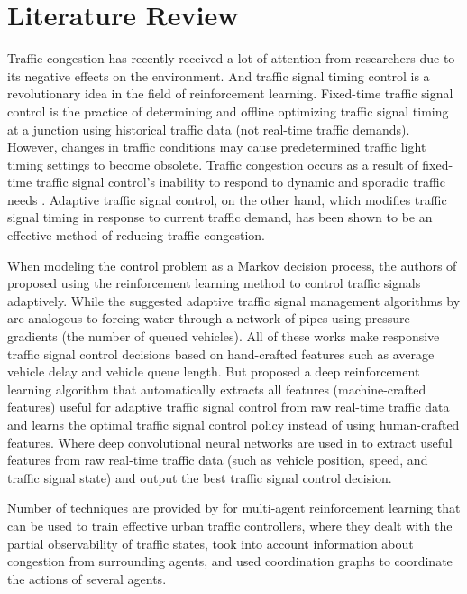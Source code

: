 \documentclass[conference]{IEEEtran}
\begin{document}
\section{Literature Review}
Traffic congestion has recently received a lot of attention from researchers due to its negative effects on the environment. And traffic signal timing control is a revolutionary idea in the field of reinforcement learning. Fixed-time traffic signal control is the practice of determining and offline optimizing traffic signal timing at a junction using historical traffic data (not real-time traffic demands). However, changes in traffic conditions may cause predetermined traffic light timing settings to become obsolete. Traffic congestion occurs as a result of fixed-time traffic signal control's inability to respond to dynamic and sporadic traffic needs \cite{gao2017adaptive}. Adaptive traffic signal control, on the other hand, which modifies traffic signal timing in response to current traffic demand, has been shown to be an effective method of reducing traffic congestion.

When modeling the control problem as a Markov decision process, the authors of \cite{mannion2016experimental} proposed using the reinforcement learning method to control traffic signals adaptively. While the suggested adaptive traffic signal management algorithms by \cite{neely2003dynamic} are analogous to forcing water through a network of pipes using pressure gradients (the number of queued vehicles). All of these works make responsive traffic signal control decisions based on hand-crafted features such as average vehicle delay and vehicle queue length. But \cite{gao2017adaptive} proposed a deep reinforcement learning algorithm that automatically extracts all features (machine-crafted features) useful for adaptive traffic signal control from raw real-time traffic data and learns the optimal traffic signal control policy instead of using human-crafted features. Where deep convolutional neural networks are used in \cite{gao2017adaptive} to extract useful features from raw real-time traffic data (such as vehicle position, speed, and traffic signal state) and output the best traffic signal control decision. 

Number of techniques are provided by \cite{bakker2010traffic} for multi-agent reinforcement learning that can be used to train effective urban traffic controllers, where they dealt with the partial observability of traffic states, took into account information about congestion from surrounding agents, and used coordination graphs to coordinate the actions of several agents.
\end{document}
